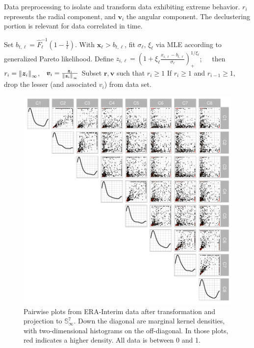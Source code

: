 \begin{algorithm}[htb]
    \caption{Data preprocessing to isolate and transform data exhibiting extreme behavior.  $r_i$
    represents the radial component, and $\bm{v}_i$ the angular component.  The declustering 
    portion is relevant for data correlated in time.\label{algo:processing}}
    \begin{algorithmic}
            \State Set $b_{t,\ell} = \hat{F}_{\ell}^{-1}\left(1 - \frac{1}{t}\right)$.
            \State With $\bm{ x}_{\ell} > b_{t,\ell}$, fit $\sigma_{\ell}$, $\xi_{\ell}$ via MLE according to generalized Pareto likelihood.
        \EndFor
            \State Define $z_{i,\ell} = \left(1 + \xi_{\ell}\frac{x_{i,\ell} - b_{t,\ell}}{\sigma_{\ell}}\right)_{+}^{1/\xi_{\ell}}$; $\;\;\;$ then $r_i = \pnorm{\bm{ z}_i}{\infty}$, $\;\;\bm{ v}_i = \frac{\bm{ z}_i}{\pnorm{\bm{ z}_i}{\infty}}$
        \EndFor
        \State Subset $\bm{ r},\bm{ v}$ such that $r_i \geq 1$
                \State If $r_i \geq 1$ and $r_{i-1} \geq 1$, drop the lesser (and associated $v_i$) from data set.
            \EndFor
        \EndIf
    \end{algorithmic}
\end{algorithm}


\begin{figure}[ht]%
    \centering
    \includegraphics[width=.7\linewidth]{./images/data_transformed}
    \caption{Pairwise plots from ERA-Interim data after transformation and projection to ${\mathbb S}_{\infty}^{7}$.  Down the diagonal are marginal kernel densities, with two-dimensional histograms on the off-diagonal.  In those plots, red indicates a higher density.  All data is between 0 and 1.\label{fig:erai_data}}
\end{figure}

